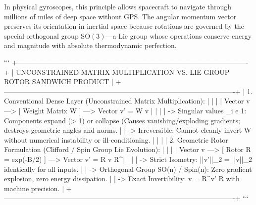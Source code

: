 \documentclass[11pt,twoside,openright]{amsbook}
\begin{document}
{{{{{{In physical gyroscopes, this principle allows spacecraft to navigate through millions of miles of deep space without GPS. The angular momentum vector preserves its orientation in inertial space because rotations are governed by the special orthogonal group $\mathrm{SO}(3)$—a Lie group whose operations conserve energy and magnitude with absolute thermodynamic perfection.

```
+----------------------------------------------------------------------------------------------------+
| UNCONSTRAINED MATRIX MULTIPLICATION VS. LIE GROUP ROTOR SANDWICH PRODUCT                           |
+----------------------------------------------------------------------------------------------------+
| 1. Conventional Dense Layer (Unconstrained Matrix Multiplication):                                 |
|                                                                                                    |
|    Vector v ---> [ Weight Matrix W ] ---> Vector v' = W v                                          |
|                                                                                                    |
|    -> Singular values \sigma_i 
e 1: Components expand (\sigma > 1) or collapse (\sigma  Causes vanishing/exploding gradients; destroys geometric angles and norms.                   |
|    -> Irreversible: Cannot cleanly invert W without numerical instability or ill-conditioning.     |
|                                                                                                    |
| 2. Geometric Rotor Formulation (Clifford / Spin Group Lie Evolution):                              |
|                                                                                                    |
|    Vector v ---> [ Rotor R = exp(-B/2) ] ---> Vector v' = R v R^\dagger                           |
|                                                                                                    |
|    -> Strict Isometry: ||v'||_2 = ||v||_2 identically for all inputs.                              |
|    -> Orthogonal Group SO(n) / Spin(n): Zero gradient explosion, zero energy dissipation.          |
|    -> Exact Invertibility: v = R^\dagger v' R with machine precision.                              |
+----------------------------------------------------------------------------------------------------+
```

}}}}}}
\end{document}
